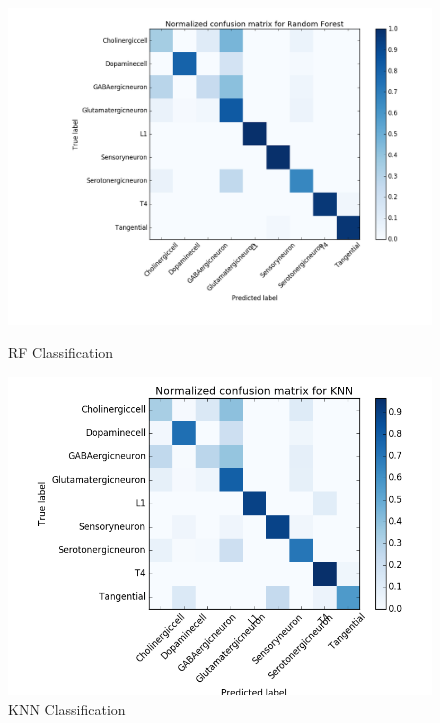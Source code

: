 \documentclass[10pt,twocolumn]{article}
\begin{document}
\begin{figure}[htbp] 
	\begin{minipage}{0.5\linewidth} 
		\centering 
		\includegraphics[width=\textwidth]{img/RFmatrix.png} 
		\caption{RF Classification} 
		\label{fig:RFmat} 
	\end{minipage}%
	\begin{minipage}{0.5\linewidth} 
		\centering 
		\includegraphics[width=\textwidth]{img/KNNmatrix.png}
		\caption{KNN Classification} 
		\label{fig:KNNmat} 
	 \end{minipage}
\end{figure}
\end{document}
